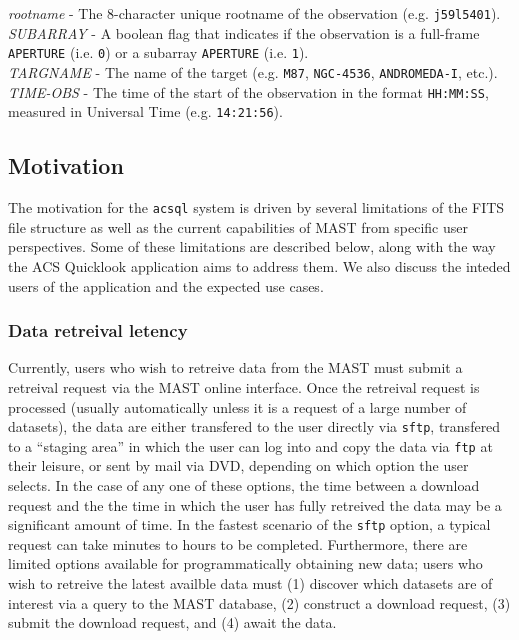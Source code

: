 \documentclass[10pt,journal,compsoc]{IEEEtran}
\begin{document}
\textit{rootname} - The 8-character unique rootname of the observation (e.g. \texttt{j59l5401}).\\

\textit{SUBARRAY} - A boolean flag that indicates if the observation is a full-frame \texttt{APERTURE}
(i.e. \texttt{0}) or a subarray \texttt{APERTURE} (i.e. \texttt{1}).\\

\textit{TARGNAME} - The name of the target (e.g. \texttt{M87}, \texttt{NGC-4536}, \texttt{ANDROMEDA-I}, etc.).\\

\textit{TIME-OBS} - The time of the start of the observation in the format \texttt{HH:MM:SS}, measured in
Universal Time (e.g. \texttt{14:21:56}).\\


\subsection{Motivation}

The motivation for the \texttt{acsql} system is driven by several limitations
of the FITS file structure as well as the current capabilities of MAST from specific
user perspectives. Some of these limitations are described below, along with the
way the ACS Quicklook application aims to address them.  We also discuss the
inteded users of the application and the expected use cases.\newline

\subsubsection{Data retreival letency}

Currently, users who wish to retreive data from the MAST must submit a retreival
request via the MAST online interface. Once the retreival request is processed
(usually automatically unless it is a request of a large number of datasets),
the data are either transfered to the user directly via \texttt{sftp}, transfered
to a ``staging area'' in which the user can log into and copy the data via
\texttt{ftp} at their leisure, or sent by mail via DVD, depending on which option
the user selects.  In the case of any one of these options, the time between a
download request and the the time in which the user has fully retreived the data
may be a significant amount of time.  In the fastest scenario of the
\texttt{sftp} option, a typical request can take minutes to hours to be completed.
Furthermore, there are limited options available for programmatically obtaining new
data; users who wish to retreive the latest availble data must (1) discover which
datasets are of interest via a query to the MAST database, (2) construct a download
request, (3) submit the download request, and (4) await the data.
\end{document}
